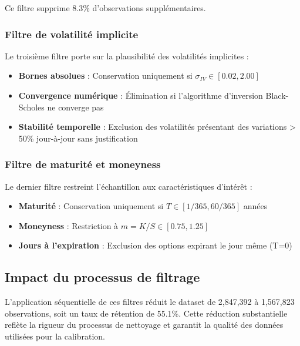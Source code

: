 Ce filtre supprime 8.3\% d'observations supplémentaires.

\subsubsection{Filtre de volatilité implicite}

Le troisième filtre porte sur la plausibilité des volatilités implicites :

\begin{itemize}
\item \textbf{Bornes absolues} : Conservation uniquement si $\sigma_{IV} \in [0.02, 2.00]$
\item \textbf{Convergence numérique} : Élimination si l'algorithme d'inversion Black-Scholes ne converge pas
\item \textbf{Stabilité temporelle} : Exclusion des volatilités présentant des variations > 50\% jour-à-jour sans justification
\end{itemize}

\subsubsection{Filtre de maturité et moneyness}

Le dernier filtre restreint l'échantillon aux caractéristiques d'intérêt :

\begin{itemize}
\item \textbf{Maturité} : Conservation uniquement si $T \in [1/365, 60/365]$ années
\item \textbf{Moneyness} : Restriction à $m = K/S \in [0.75, 1.25]$
\item \textbf{Jours à l'expiration} : Exclusion des options expirant le jour même (T=0)
\end{itemize}

\subsection{Impact du processus de filtrage}

L'application séquentielle de ces filtres réduit le dataset de 2,847,392 à 1,567,823 observations, soit un taux de rétention de 55.1\%. Cette réduction substantielle reflète la rigueur du processus de nettoyage et garantit la qualité des données utilisées pour la calibration.


